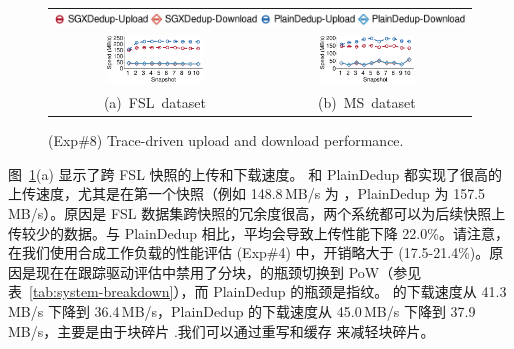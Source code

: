 \begin{figure}[t]
  \centering
  \begin{tabular}{@{\ }c@{\ }c}
  \multicolumn{2}{c}{\includegraphics[width=\textwidth]{pic/sgxdedup/expb2_trace_legend.pdf}} \\
  \hspace{-0.1in}
  \includegraphics[width=0.48\textwidth]{pic/sgxdedup/expb2_trace_fsl_plain_sgx.pdf} &
  \includegraphics[width=0.48\textwidth]{pic/sgxdedup/expb2_trace_ms_plain_sgx.pdf}
  \vspace{-3pt}\\
  \mbox{\small (a) FSL dataset} &
  \mbox{\small (b) MS dataset}
  \end{tabular}
  \vspace{-6pt}
  \caption{(Exp\#8) Trace-driven upload and download performance.}
  \label{fig:tracePerformance}
\end{figure}

图~\ref{fig:tracePerformance}(a) 显示了跨 FSL 快照的上传和下载速度。 \sysname 和 PlainDedup 都实现了很高的上传速度，尤其是在第一个快照（例如 148.8\,MB/s \sysname 为 ，PlainDedup 为 157.5\,MB/s）。原因是 FSL 数据集跨快照的冗余度很高，两个系统都可以为后续快照上传较少的数据。与 PlainDedup 相比，\sysname 平均会导致上传性能下降 22.0\%。请注意，在我们使用合成工作负载的性能评估 (Exp\#4) 中，开销略大于 (17.5-21.4\%)。原因是现在在跟踪驱动评估中禁用了分块，\sysname 的瓶颈切换到 PoW（参见表~\ref{tab:system-breakdown}），而 PlainDedup 的瓶颈是指纹。 \sysname 的下载速度从 41.3\,MB/s 下降到 36.4\,MB/s，PlainDedup 的下载速度从 45.0\,MB/s 下降到 37.9\,MB/s，主要是由于块碎片 \cite{lillibridge13} .我们可以通过重写和缓存 \cite{lillibridge13,cao18} 来减轻块碎片。

